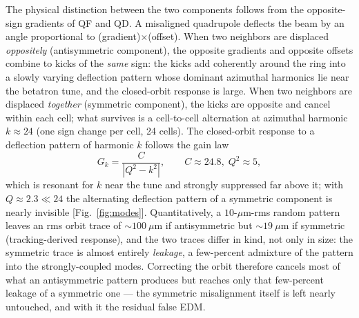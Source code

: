 \documentclass[aps,prab,reprint,superscriptaddress,nofootinbib]{revtex4-2}
\begin{document}
The physical distinction between the two components follows from the
opposite-sign gradients of QF and QD.  A misaligned quadrupole deflects the
beam by an angle proportional to (gradient)$\times$(offset).  When two
neighbors are displaced \emph{oppositely} (antisymmetric component), the
opposite gradients and opposite offsets combine to kicks of the \emph{same}
sign: the kicks add coherently around the ring into a slowly varying
deflection pattern whose dominant azimuthal harmonics lie near the betatron
tune, and the closed-orbit response is large.  When two neighbors are
displaced \emph{together} (symmetric component), the kicks are opposite and
cancel within each cell; what survives is a cell-to-cell alternation at
azimuthal harmonic $k \approx 24$ (one sign change per cell, 24 cells).  The
closed-orbit response to a deflection pattern of harmonic $k$ follows the
gain law
\begin{equation}
  G_k = \frac{C}{|Q^2 - k^2|}, \qquad C \approx 24.8,\; Q^2 \approx 5 ,
  \label{eq:Gk}
\end{equation}
which is resonant for $k$ near the tune and strongly suppressed far above it;
with $Q \approx 2.3 \ll 24$ the alternating deflection pattern of a symmetric
component is nearly invisible [Fig.~\ref{fig:modes}].  Quantitatively, a
$10$-$\mu$m-rms random pattern leaves an rms orbit trace of $\sim\!100~\mu$m
if antisymmetric but $\sim\!19~\mu$m if symmetric (tracking-derived response),
and the two traces differ in kind, not only in size: the symmetric trace is
almost entirely \emph{leakage}, a few-percent admixture of the pattern into
the strongly-coupled modes.  Correcting the orbit therefore cancels most of
what an antisymmetric pattern produces but reaches only that few-percent
leakage of a symmetric one --- the symmetric misalignment itself is left nearly
untouched, and with it the residual false EDM.
\end{document}
